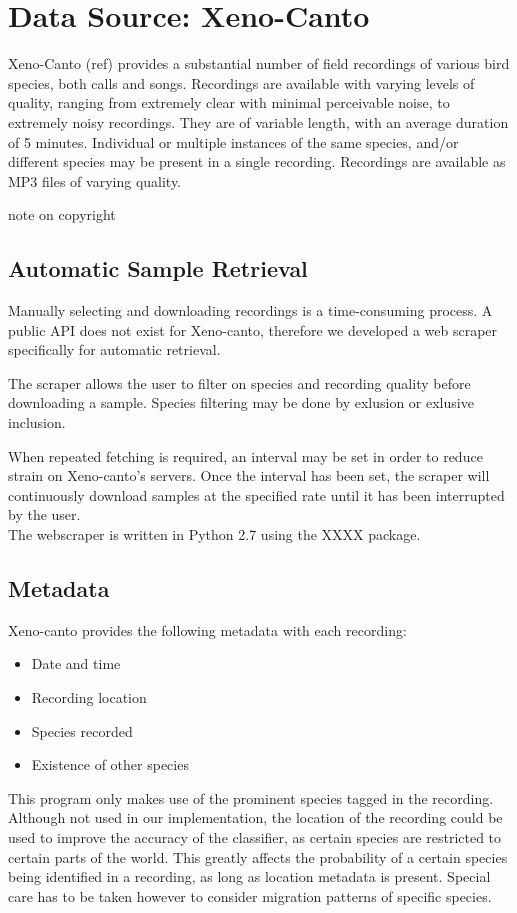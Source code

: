 \section{Data Source: Xeno-Canto}

Xeno-Canto (ref) provides a substantial number of field recordings of various
bird species, both calls and songs.
Recordings are available with varying levels of quality, ranging from extremely
clear with minimal perceivable noise, to extremely noisy recordings.
They are of variable length, with an average duration of 5 minutes.
Individual or multiple instances of the same species, and/or
different species may be present in a single recording.
Recordings are available as MP3 files of varying quality.

note on copyright

\subsection{Automatic Sample Retrieval}
Manually selecting and downloading recordings is a time-consuming process.
A public API does not exist for Xeno-canto, therefore we developed a web scraper
specifically for automatic retrieval.

The scraper allows the user to filter on species and recording quality before
downloading a sample.
Species filtering may be done by exlusion or exlusive inclusion.

When repeated fetching is required, an interval may be set in order to reduce
strain on Xeno-canto's servers.
Once the interval has been set, the scraper will continuously download samples
at the specified rate until it has been interrupted by the user.\\

The webscraper is written in Python 2.7 using the XXXX package.

\subsection{Metadata}
Xeno-canto provides the following metadata with each recording:
\begin{itemize}[noitemsep]
  \item Date and time
  \item Recording location
  \item Species recorded
  \item Existence of other species
\end{itemize}

This program only makes use of the prominent species tagged in the recording.
Although not used in our implementation, the location of the recording could be
used to improve the accuracy of the classifier, as certain species are restricted
to certain parts of the world.
This greatly affects the probability of a certain species being identified in
a recording, as long as location metadata is present.
Special care has to be taken however to consider migration patterns of specific
species.
